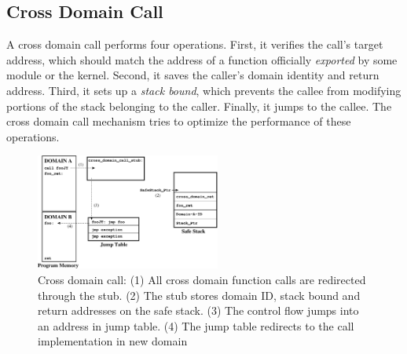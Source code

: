 \subsection{Cross Domain Call}
\label{sec:crossdomcall}
%
%
%
%
A cross domain call performs four operations.
%
First, it verifies the call's target address, which
%
should match the address of a function officially \emph{exported} by some
module or the kernel.
%
Second, it saves the caller's domain identity and return address.
%
Third, it sets up a \emph{stack bound}, which prevents the callee from
modifying portions of the stack belonging to the caller.
%
Finally, it jumps to the callee.
%
%
The cross domain call mechanism tries to optimize the performance of these operations.
%

\begin{figure}[htbp]
   \centering
   \includegraphics[height=1.5in, keepaspectratio=true]{figures/cross_domain_call_step.eps} 
   \caption[Cross domain call operation]{Cross domain call: (1) All
     cross domain function calls are redirected through the stub. (2)
     The stub stores domain ID, stack bound and return addresses on
     the safe stack. (3) The control flow jumps into an address in
     jump table. (4) The jump table redirects to the call
     implementation in new domain}
   \label{fig:cross_domain_call}
\end{figure}


